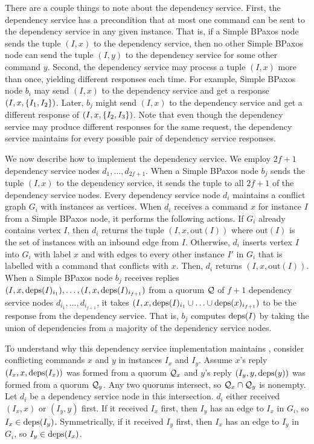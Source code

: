 There are a couple things to note about the dependency service.
%
First, the dependency service has a precondition that at most one command can
be sent to the dependency service in any given instance. That is, if a Simple
BPaxos node sends the tuple $(I, x)$ to the dependency service, then no other
Simple BPaxos node can send the tuple $(I, y)$ to the dependency service for
some other command $y$.
%
Second, the dependency service may process a tuple $(I, x)$ more than once,
yielding different responses each time. For example, Simple BPaxos node $b_i$
may send $(I, x)$ to the dependency service and get a response $(I, x,
\{I_1, I_2\})$. Later, $b_j$ might send $(I, x)$ to the dependency service
and get a different response of $(I, x, \{I_2, I_3\})$. Note that even though
the dependency service may produce different responses for the same request,
the dependency service maintains  for every possible
pair of dependency service responses.

\newcommand{\out}[1]{\text{out}(#1)}
We now describe how to implement the dependency service. We employ $2f + 1$
dependency service nodes $d_{1}, \ldots, d_{2f + 1}$. When a Simple BPaxos node
$b_j$ sends the tuple $(I, x)$ to the dependency service, it sends the tuple to
all $2f + 1$ of the dependency service nodes. Every dependency service node
$d_i$ maintains a conflict graph $G_i$ with instances as vertices. When $d_i$
receives a command $x$ for instance $I$ from a Simple BPaxos node, it performs
the following actions.
%
If $G_i$ already contains vertex $I$, then $d_i$ returns the tuple $(I, x,
\out{I})$ where $\out{I}$ is the set of instances with an inbound edge from
$I$.
%
Otherwise, $d_i$ inserts vertex $I$ into $G_i$ with label $x$ and with edges to
every other instance $I'$ in $G_i$ that is labelled with a command that
conflicts with $x$. Then, $d_i$ returns $(I, x, \out{I})$.
%
When a Simple BPaxos node $b_j$ receives replies $(I, x, \text{deps}(I)_{i_1}),
\ldots, (I, x, \text{deps}(I)_{i_{f+1}})$ from a quorum $\mathcal{Q}$ of $f + 1$
dependency service nodes $d_{i_1}, \ldots, d_{i_{f+1}}$, it takes $(I, x,
\text{deps}(I)_{i_1} \cup \ldots \cup \text{deps}(x)_{i_{f+1}})$ to be the response from
the dependency service. That is, $b_j$ computes $\text{deps}(I)$ by taking the union
of dependencies from a majority of the dependency service nodes.

To understand why this dependency service implementation maintains
, consider conflicting commands $x$ and $y$ in
instances $I_x$ and $I_y$. Assume $x$'s reply $(I_x, x, \text{deps}(I_x))$ was formed
from a quorum $\mathcal{Q}_x$ and $y$'s reply $(I_y, y, \text{deps}(y))$ was formed from
a quorum $\mathcal{Q}_y$. Any two quorums intersect, so $\mathcal{Q}_x \cap \mathcal{Q}_y$
is nonempty. Let $d_i$ be a dependency service node in this intersection. $d_i$
either received $(I_x, x)$ or $(I_y, y)$ first. If it received $I_x$ first,
then $I_y$ has an edge to $I_x$ in $G_i$, so $I_x \in \text{deps}(I_y)$.
Symmetrically, if it received $I_y$ first, then $I_x$ has an edge to $I_y$ in
$G_i$, so $I_y \in \text{deps}(I_x)$.

